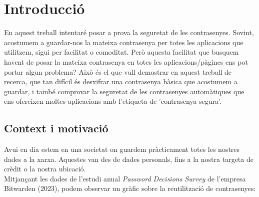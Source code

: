 \chapter{Introducció}
En aquest treball intentaré posar a prova la seguretat de les contrasenyes. Sovint, acostumem a guardar-nos la mateixa contrasenya per totes les aplicacions que utilitzem, sigui per facilitat o comoditat. Però aquesta facilitat que busquem havent de posar la mateixa contrasenya en totes les aplicacions/pàgines ens pot portar algun problema? Això és el que vull demostrar en aquest treball de recerca, que tan difícil és desxifrar una contrasenya bàsica que acostumem a guardar, i també comprovar la seguretat de les contrasenyes automàtiques que ens ofereixen moltes aplicacions amb l'etiqueta de 'contrasenya segura'.

\section{Context i motivació}
Avui en dia estem en una societat on guardem pràcticament totes les nostres dades a la xarxa. Aquestes van des de dades personals, fins a la nostra targeta de crèdit o la nostra ubicació.\\
Mitjançant les dades de l'estudi anual \textit{Password Decisions Survey} de l'empresa Bitwarden (2023), podem observar un gràfic sobre la reutilització de contrasenyes:

